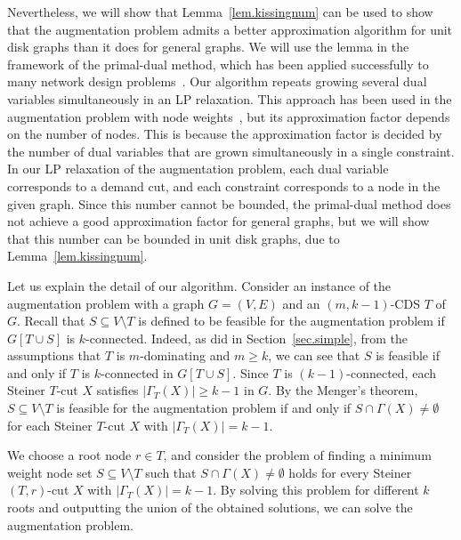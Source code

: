 \documentclass[11pt]{article}
\begin{document}
Nevertheless, we will show that Lemma~\ref{lem.kissingnum} can be used to show 
that the augmentation problem admits a better approximation algorithm for unit disk graphs
than it does for general graphs. We will use the lemma in the framework
of the primal-dual method,
which has been applied successfully to many
network design problems~\cite{goemans1997primal}.
Our algorithm repeats growing several dual
variables simultaneously in an LP relaxation.
This approach has been used in the augmentation
problem with node weights~\cite{ChekuriEV12,Fukunaga15},
but 
its approximation factor depends on the number of nodes.
This is because the approximation factor is decided by the number of
dual variables that
are grown simultaneously in a single constraint.
In our LP relaxation of the augmentation problem, each dual variable
corresponds to
a demand cut, and each constraint corresponds to
a node in the given graph.
Since this number cannot be bounded, the primal-dual
method does not achieve a good approximation factor for
general graphs, but we will show that this number can be bounded in unit disk graphs, due to Lemma~\ref{lem.kissingnum}.

Let us explain the detail of our algorithm.
Consider an instance of the augmentation problem with a graph $G=(V,E)$
and an $(m,k-1)$-CDS $T$ of $G$.
Recall that $S \subseteq V \setminus T$ is defined to be feasible for the augmentation
problem
if $G[T \cup S]$ is $k$-connected.
Indeed,
as did in Section~\ref{sec.simple},
from the assumptions that $T$ is $m$-dominating and $m\geq k$,
we can see that $S$ is feasible if and only if
$T$ is $k$-connected in
$G[T\cup S]$.
Since $T$ is $(k-1)$-connected,
each Steiner $T$-cut $X$ satisfies $|\Gamma_T(X)| \geq k-1$ in $G$.
By the Menger's theorem, $S\subseteq V \setminus T$ is feasible for the augmentation problem
if and only if $S \cap \Gamma(X) \neq \emptyset$ for 
each Steiner $T$-cut $X$ with $|\Gamma_T(X)| = k-1$.

We choose a root node $r \in T$, and consider
the problem of finding a minimum weight node set
$S \subseteq V \setminus T$ such that
$S \cap \Gamma(X)\neq \emptyset$ holds for 
every Steiner $(T,r)$-cut $X$ with $|\Gamma_T(X)|=k-1$.
By solving this problem for different $k$ roots and
outputting the union of the obtained solutions,
we can solve the augmentation problem.
\end{document}
